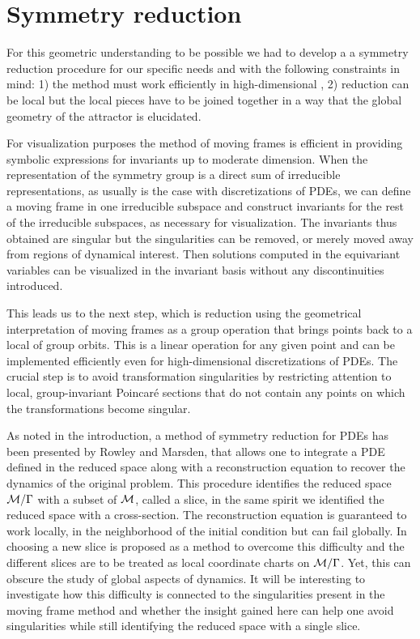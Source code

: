\section{Symmetry reduction}

For this geometric understanding to be possible we had to develop a
a symmetry reduction procedure for our specific needs
and with the following
constraints in mind:
1) the method must work efficiently in high-dimensional \statesp, 2) reduction
can be local but the local pieces have to be joined together in
a way that the global geometry of the attractor is elucidated.

For visualization purposes the method of moving frames is efficient in providing
symbolic expressions for invariants up to moderate dimension. When the
representation of the symmetry group is a direct sum of irreducible representations,
as usually is the case with discretizations of PDEs, we can define a moving
frame in one irreducible subspace and construct invariants for the rest of
the irreducible subspaces, as necessary for visualization.
The invariants thus obtained are singular but the singularities can be removed,
or merely moved away from regions of dynamical interest.
Then solutions computed in the equivariant variables can be visualized
in the invariant basis without any discontinuities introduced.

This leads us to the next step, which is reduction using the
geometrical interpretation of moving frames as a group
operation that brings points back to a local {\csection} of
group orbits. This is a linear operation for any given point
and can be implemented efficiently even for high-dimensional
discretizations of PDEs. The crucial step is to avoid
transformation singularities by restricting attention to
local, group-invariant Poincar\'e sections that do not
contain any points on which the transformations become
singular.

As noted in the introduction, a method of symmetry reduction
for PDEs has been presented by Rowley and
Marsden, that allows one to
integrate a PDE defined in the reduced space along with a
reconstruction equation to recover the dynamics of the
original problem. This procedure identifies the reduced space
$\mathcal{M}/\Gamma$ with a subset of $\mathcal{M}$, called a slice, in
the same spirit we identified the reduced space with a
cross-section.
The reconstruction equation is guaranteed to
work locally, in the neighborhood of the initial condition
but can fail globally. In 
choosing a new slice is proposed as a method to overcome this
difficulty and the different slices are to be treated as
local coordinate charts on $\mathcal{M}/\Gamma$. Yet, this can
obscure the study of global aspects of dynamics. It will be
interesting to investigate how this difficulty is connected
to the singularities present in the moving frame method and
whether the insight gained here can help one avoid
singularities while still identifying the reduced space with
a single slice.


